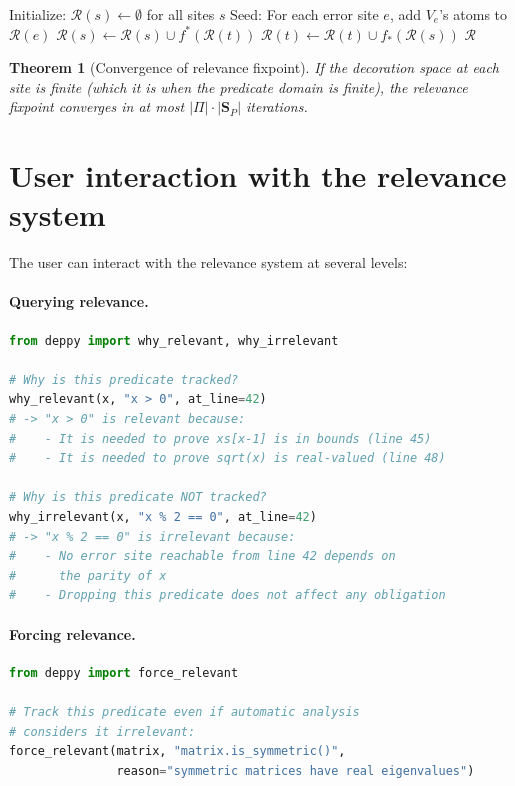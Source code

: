 \documentclass[11pt]{report}
\theoremstyle{definition}
\theoremstyle{plain}
\newtheorem{theorem}[definition]{Theorem}
\begin{document}
\begin{algorithm}[H]
\caption{Relevance fixpoint computation}
\begin{algorithmic}[1]
\State Initialize: $\mathcal{R}(s) \gets \emptyset$ for all sites $s$
\State Seed: For each error site $e$, add $V_e$'s atoms to $\mathcal{R}(e)$
\Repeat
    \State $\mathcal{R}(s) \gets \mathcal{R}(s) \cup f^*(\mathcal{R}(t))$
    \State $\mathcal{R}(t) \gets \mathcal{R}(t) \cup f_*(\mathcal{R}(s))$
  \EndFor
{}
\State \Return $\mathcal{R}$
\end{algorithmic}
\end{algorithm}

\begin{theorem}[Convergence of relevance fixpoint]
If the decoration space at each site is finite (which it is when the
predicate domain is finite), the relevance fixpoint converges in at most
$|\Pi| \cdot |\mathbf{S}_P|$ iterations.
\end{theorem}

\section{User interaction with the relevance system}

The user can interact with the relevance system at several levels:

\paragraph{Querying relevance.}
\begin{lstlisting}[style=deppy,language=Python]
from deppy import why_relevant, why_irrelevant

# Why is this predicate tracked?
why_relevant(x, "x > 0", at_line=42)
# -> "x > 0" is relevant because:
#    - It is needed to prove xs[x-1] is in bounds (line 45)
#    - It is needed to prove sqrt(x) is real-valued (line 48)

# Why is this predicate NOT tracked?
why_irrelevant(x, "x % 2 == 0", at_line=42)
# -> "x % 2 == 0" is irrelevant because:
#    - No error site reachable from line 42 depends on
#      the parity of x
#    - Dropping this predicate does not affect any obligation
\end{lstlisting}

\paragraph{Forcing relevance.}
\begin{lstlisting}[style=deppy,language=Python]
from deppy import force_relevant

# Track this predicate even if automatic analysis
# considers it irrelevant:
force_relevant(matrix, "matrix.is_symmetric()",
               reason="symmetric matrices have real eigenvalues")
\end{lstlisting}
\end{document}
